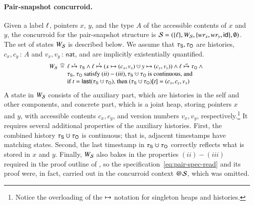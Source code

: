 \paragraph{Pair-snapshot concurroid.}
Given a label $\ell$, pointers $x$, $y$, and the type $A$ of the
accessible contents of $x$ and $y$, the concurroid for the
pair-snapshot structure is ${\mathcal{S}} = (\{\ell\}, W_{\mathcal{S}}, \{wr_x,
wr_y, \mathsf{id}\}, \emptyset)$.
%
The set of states $W_{\mathcal{S}}$ is described below. We assume that
$\tau_{\mathsf{S}}, \tau_{\mathsf{O}}$ are histories, $c_x, c_y\,{:}\,A$ and $v_x,
v_y\,{:}\,\mathsf{nat}$, and are implicitly existentially quantified.
%
%
\[
{\small
\begin{array}{l@{\ }c@{\ }l}
W_{\pscon} & \eqdef & \hps \spts \histS \aand \hps \jpts (x \hpts (c_x, v_x) \hunion y \hpts (c_y, v_y)) \aand \hps \opts \histO \aand \hbox{}\\
    & & \mbox{$\histS$, $\histO$ satisfy $(ii)-(iii)$}, \mbox{$\histS \hunion \histO$ is continuous, and}\\
    & & \mbox{if $t = \last{\histS \hunion \histO}$, then $(\histS \hunion \histO)[t] = (c_x, c_y, v_x)$}
\end{array}
}
\]
%
A state in $W_{\mathcal{S}}$ consists of the auxiliary part, which are
histories in the self and other components, and concrete part, which
is a joint heap, storing pointers $x$ and $y$, with accessible
contents $c_x, c_y$, and version numbers $v_x, v_y$,
respectively.\footnote{Notice the overloading of the $\mapsto$ notation
  for singleton heaps and histories.}
%
It requires several additional properties of the auxiliary
histories. First, the combined history $\histS \hunion \histO$ is
continuous; that is, adjacent timestamps have matching states. Second,
the last timestamp in $\histS \hunion \histO$ correctly reflects
what is stored in $x$ and $y$. Finally, $W_{\mathcal{S}}$ also bakes in the
properties $(ii)-(iii)$ required in the proof outline of
, so the specification~\eqref{eq:pair-spec-read} and
its proof were, in fact, carried out in the concurroid context
$@\mathcal{S}$, which was omitted.

